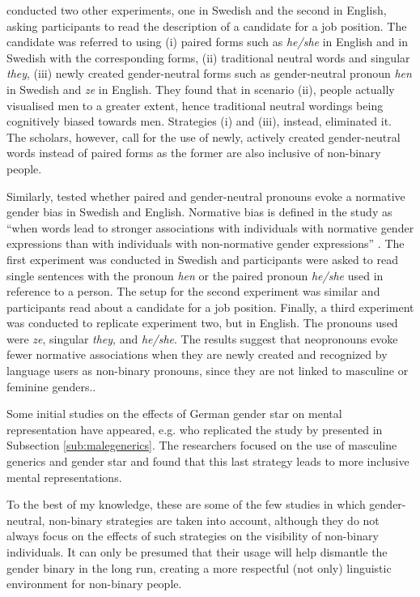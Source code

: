 \textcite{lindqvist2019reducing} conducted two other experiments, one in Swedish and the second in English, asking participants to read the description of a candidate for a job position. The candidate was referred to using (i) paired forms such as \textit{he/she} in English and in Swedish with the corresponding forms, (ii) traditional neutral words and singular \textit{they}, (iii) newly created gender-neutral forms such as gender-neutral pronoun \textit{hen} in Swedish and \textit{ze} in English. They found that in scenario (ii), people actually visualised men to a greater extent, hence traditional neutral wordings being cognitively biased towards men. Strategies (i) and (iii), instead, eliminated it. The scholars, however, call for the use of newly, actively created gender-neutral words instead of paired forms as the former are also inclusive of non-binary people. 

Similarly, \textcite{renstrom2023personal} tested whether paired and gender-neutral pronouns evoke a normative gender bias in Swedish and English. Normative bias is defined in the study as ``when words lead to stronger associations with individuals with normative gender expressions than with individuals with non-normative gender expressions'' \citep[2]{renstrom2023personal}. The first experiment was conducted in Swedish and participants were asked to read single sentences with the pronoun \textit{hen} or the paired pronoun \textit{he/she} used in reference to a person. The setup for the second experiment was similar and participants read about a candidate for a job position. Finally, a third experiment was conducted to replicate experiment two, but in English. The pronouns used were \textit{ze}, singular \textit{they}, and \textit{he/she}. The results suggest that neopronouns evoke fewer normative associations when they are newly created and recognized by language users as non-binary pronouns, since they are not linked to masculine or feminine genders..

Some initial studies on the effects of German gender star on mental representation have appeared, e.g. \textcite{kurz2023star} who replicated the study by \textcite{stahlberg2001effekte} presented in Subsection \ref{sub:malegenerics}. The researchers focused on the use of masculine generics and gender star and found that this last strategy leads to more inclusive mental representations.

To the best of my knowledge, these are some of the few studies in which gender-neutral, non-binary strategies are taken into account, although they do not always focus on the effects of such strategies on the visibility of non-binary individuals. It can only be presumed that their usage will help dismantle the gender binary in the long run, creating a more respectful (not only) linguistic environment for non-binary people.


